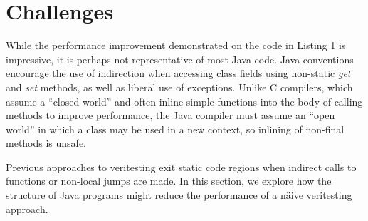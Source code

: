 \section{Challenges}

While the performance improvement demonstrated on the code in Listing 1 is impressive, it is perhaps not representative of most Java code.  Java conventions encourage the use of indirection when accessing class fields using non-static {\em get} and {\em set} methods, as well as liberal use of exceptions.  Unlike C compilers, which assume a ``closed world'' and often inline simple functions into the body of calling methods to improve performance, the Java compiler must assume an ``open world'' in which a class may be used in a new context, so inlining of non-final methods is unsafe.  

Previous approaches to veritesting exit static code regions when indirect calls to functions or non-local jumps are made.  In this section, we explore how the structure of Java programs might reduce the performance of a n\"aive veritesting approach.

%
%
%

